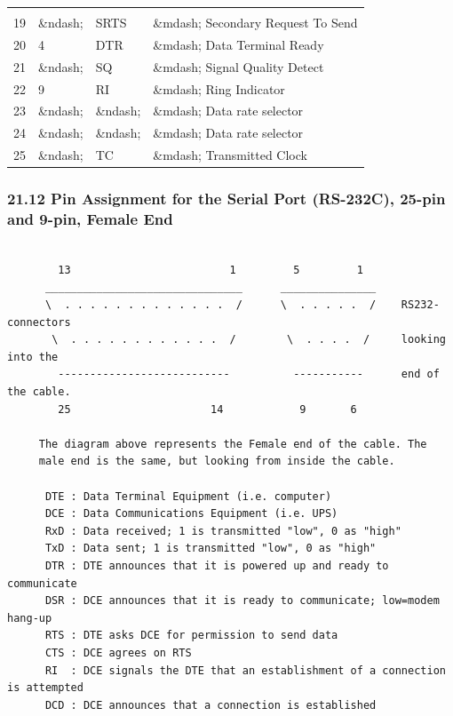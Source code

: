 \begin{longtable}{llll}
{ } \\
{19} & {\&ndash;} & {SRTS} & {\&mdash;\gt{} Secondary Request To Send 
 } \\
{20} & {4} & {DTR} & {\&mdash;\gt{} Data Terminal Ready 
 } \\
{21} & {\&ndash;} & {SQ} & {\lt{}\&mdash; Signal Quality Detect 
 } \\
{22} & {9} & {RI} & {\lt{}\&mdash; Ring Indicator 
 } \\
{23} & {\&ndash;} & {\&ndash;} & {\&mdash;\gt{} Data rate selector 
 } \\
{24} & {\&ndash;} & {\&ndash;} & {\lt{}\&mdash; Data rate selector 
 } \\
{25} & {\&ndash;} & {TC} & {\lt{}\&mdash; Transmitted Clock  
}

\end{longtable}

\label{Pin-Assignment-for-the-Serial-Port-_005bRS_002d232C_005d_003b-25_002dpi%
n-and-9_002dpin_003b-Female-End}

\subsubsection*{21.12 Pin Assignment for the Serial Port (RS-232C), 25-pin and
9-pin, Female End}

\label{index-Cables-217}

\footnotesize
\begin{verbatim}
     
        13                         1         5         1
      _______________________________      _______________
      \  . . . . . . . . . . . . .  /      \  . . . . .  /    RS232-connectors
       \  . . . . . . . . . . . .  /        \  . . . .  /     looking into the
        ---------------------------          -----------      end of the cable.
        25                      14            9       6
     
     The diagram above represents the Female end of the cable. The
     male end is the same, but looking from inside the cable.
     
      DTE : Data Terminal Equipment (i.e. computer)
      DCE : Data Communications Equipment (i.e. UPS)
      RxD : Data received; 1 is transmitted "low", 0 as "high"
      TxD : Data sent; 1 is transmitted "low", 0 as "high"
      DTR : DTE announces that it is powered up and ready to communicate
      DSR : DCE announces that it is ready to communicate; low=modem hang-up
      RTS : DTE asks DCE for permission to send data
      CTS : DCE agrees on RTS
      RI  : DCE signals the DTE that an establishment of a connection is attempted
      DCD : DCE announces that a connection is established
\end{verbatim}
\normalsize

